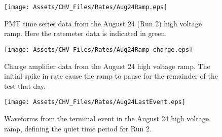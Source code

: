 




\begin{figure}
\begin{center}
\texttt{[image: Assets/CHV\_Files/Rates/Aug24Ramp.eps]}
\end{center}
\caption[PMT time series data from the August 24 (Run 2) high voltage ramp.]%
{PMT time series data from the August 24 (Run 2) high voltage ramp.
Here the ratemeter data is indicated in green.}
\label{fig:Aug24pmt}
\end{figure}

\begin{figure}
\begin{center}
\texttt{[image: Assets/CHV\_Files/Rates/Aug24Ramp\_charge.eps]}
\end{center}
\caption[Charge amplifier data from the CHV Prototype - August 24 high voltage ramp.]%
{Charge amplifier data from the August 24 high voltage ramp.
The initial spike in rate cause the ramp to pause for the remainder of the test that day.}
\label{fig:Aug24charge}
\end{figure}



\begin{figure}
\begin{center}
\texttt{[image: Assets/CHV\_Files/Rates/Aug24LastEvent.eps]}
\end{center}

\caption[Waveforms from the terminal event in the CHV Prototype - August 24 high voltage ramp, defining the quiet time period for Run 2.]%
{Waveforms from the terminal event in the August 24 high voltage ramp, defining the quiet time period for Run 2.}
\label{fig:Aug24LastEvent}
\end{figure}


